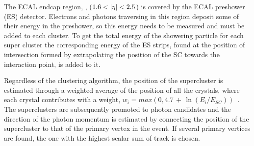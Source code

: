 The ECAL endcap region, \ie, ($1.6<\lvert \eta \rvert<2.5$) is covered by the ECAL preshower (ES) detector. Electrons and photons traversing in this
region deposit some of their energy in the preshower, so this energy needs to be measured and must be added to each cluster. 
To get the total energy of the showering particle for each super cluster the corresponding energy of the ES strips, found at the position of
intersection formed by extrapolating the position of the SC towards the interaction point, is added to it.

Regardless of the clustering algorithm, the position of the supercluster is estimated through a weighted average of the position of all the 
crystals, where each crystal contributes with a weight, $w_{i} = max(0,4.7\,+\,\ln(E_{i}/E_{SC}))$~\cite{Meschi:687345}. The superclusters 
are subsequently promoted to photon candidates and the direction of the photon momentum is estimated by connecting the position of the supercluster 
to that of the primary vertex in the event. If several primary vertices are found, the one with the highest scalar sum of track  is chosen.

